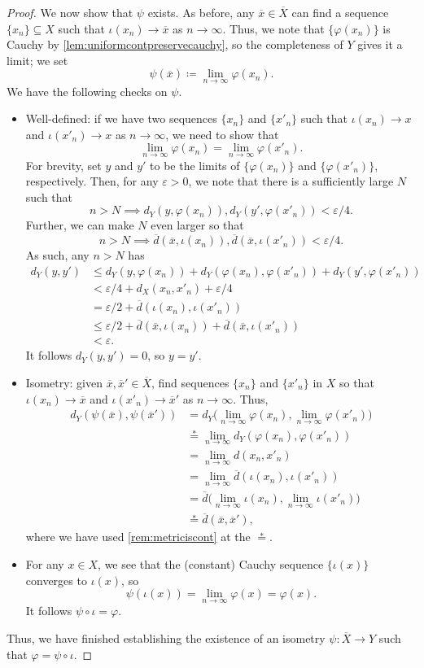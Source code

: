 \documentclass[../notes.tex]{subfiles}
\begin{document}
\begin{proof}
	We now show that $\psi$ exists. As before, any $\overline x\in\overline X$ can find a sequence $\{x_n\}\subseteq X$ such that $\iota(x_n)\to\overline x$ as $n\to\infty$. Thus, we note that $\{\varphi(x_n)\}$ is Cauchy by \autoref{lem:uniformcontpreservecauchy}, so the completeness of $Y$ gives it a limit; we set
	\[\psi(\overline x)\coloneqq\lim_{n\to\infty}\varphi(x_n).\]
	We have the following checks on $\psi$.
	\begin{itemize}
		\item Well-defined: if we have two sequences $\{x_n\}$ and $\{x'_n\}$ such that $\iota(x_n)\to x$ and $\iota(x'_n)\to x$ as $n\to\infty$, we need to show that
		\[\lim_{n\to\infty}\varphi(x_n)=\lim_{n\to\infty}\varphi(x'_n).\]
		For brevity, set $y$ and $y'$ to be the limits of $\{\varphi(x_n)\}$ and $\{\varphi(x'_n)\}$, respectively. Then, for any $\varepsilon>0$, we note that there is a sufficiently large $N$ such that
		\[n>N\implies d_Y(y,\varphi(x_n)),d_Y(y',\varphi(x'_n))<\varepsilon/4.\]
		Further, we can make $N$ even larger so that
		\[n>N\implies\overline d(\overline x,\iota(x_n)),\overline d(\overline x,\iota(x'_n))<\varepsilon/4.\]
		As such, any $n>N$ has
		\begin{align*}
			d_Y(y,y') &\le d_Y(y,\varphi(x_n))+d_Y(\varphi(x_n),\varphi(x'_n))+d_Y(y',\varphi(x'_n)) \\
			&< \varepsilon/4+d_X(x_n,x'_n)+\varepsilon/4 \\
			&= \varepsilon/2+\overline d(\iota(x_n),\iota(x'_n)) \\
			&\le \varepsilon/2+\overline d(\overline x,\iota(x_n))+\overline d(\overline x,\iota(x'_n)) \\
			&< \varepsilon.
		\end{align*}
		It follows $d_Y(y,y')=0$, so $y=y'$.
		\item Isometry: given $\overline x,\overline x'\in\overline X$, find sequences $\{x_n\}$ and $\{x'_n\}$ in $X$ so that $\iota(x_n)\to\overline x$ and $\iota(x'_n)\to\overline x'$ as $n\to\infty$. Thus,
		\begin{align*}
			d_Y(\psi(\overline x),\psi(\overline x')) &= d_Y\Big(\lim_{n\to\infty}\varphi(x_n),\lim_{n\to\infty}\varphi(x'_n)\Big) \\
			&\stackrel*= \lim_{n\to\infty}d_Y(\varphi(x_n),\varphi(x'_n)) \\
			&= \lim_{n\to\infty}d(x_n,x'_n) \\
			&= \lim_{n\to\infty}\overline d(\iota(x_n),\iota(x'_n)) \\
			&= \overline d\Big(\lim_{n\to\infty}\iota(x_n),\lim_{n\to\infty}\iota(x'_n)\Big) \\
			&\stackrel*= \overline d(\overline x,\overline x'),
		\end{align*}
		where we have used \autoref{rem:metriciscont} at the $\stackrel*=$.
		\item For any $x\in X$, we see that the (constant) Cauchy sequence $\{\iota(x)\}$ converges to $\iota(x)$, so
		\[\psi(\iota(x))=\lim_{n\to\infty}\varphi(x)=\varphi(x).\]
		It follows $\psi\circ\iota=\varphi$.
	\end{itemize}
	Thus, we have finished establishing the existence of an isometry $\psi\colon\overline X\to Y$ such that $\varphi=\psi\circ\iota$.
\end{proof}
\end{document}

